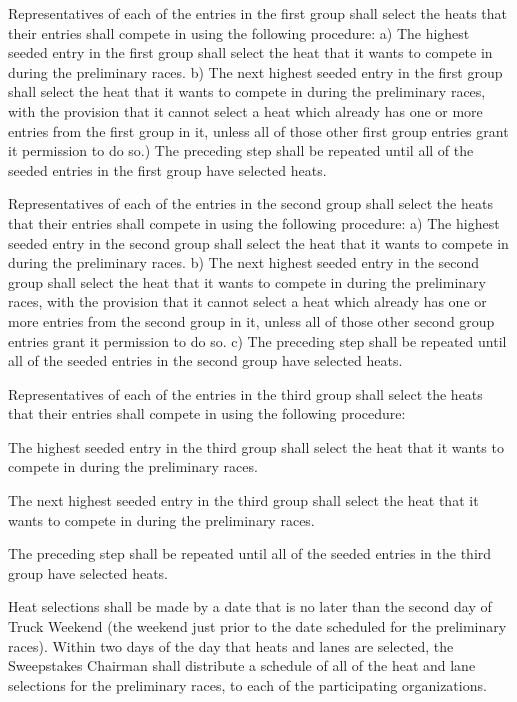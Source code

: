 Representatives of each of the entries in the first group shall select the heats that their entries shall compete in using the following procedure: a) The highest seeded entry in the first group shall select the heat that it wants to compete in during the preliminary races. b) The next highest seeded entry in the first group shall select the heat that it wants to compete in during the preliminary races, with the provision that it cannot select a heat which already has one or more entries from the first group in it, unless all of those other first group entries grant it permission to do so.) The preceding step shall be repeated until all of the seeded entries in the first group have selected heats.

Representatives of each of the entries in the second group shall select the heats that their entries shall compete in using the following procedure: a) The highest seeded entry in the second group shall select the heat that it wants to compete in during the preliminary races. b) The next highest seeded entry in the second group shall select the heat that it wants to compete in during the preliminary races, with the provision that it cannot select a heat which already has one or more entries from the second group in it, unless all of those other second group entries grant it permission to do so. c) The preceding step shall be repeated until all of the seeded entries in the second group have selected heats.

Representatives of each of the entries in the third group shall select the heats that their entries shall compete in using the following procedure:

The highest seeded entry in the third group shall select the heat that it wants to compete in during the preliminary races.

The next highest seeded entry in the third group shall select the heat that it wants to compete in during the preliminary races.

The preceding step shall be repeated until all of the seeded entries in the third group have selected heats.

Heat selections shall be made by a date that is no later than the second day of Truck Weekend (the weekend just prior to the date scheduled for the preliminary races). Within two days of the day that heats and lanes are selected, the Sweepstakes Chairman shall distribute a schedule of all of the heat and lane selections for the preliminary races, to each of the participating organizations.

